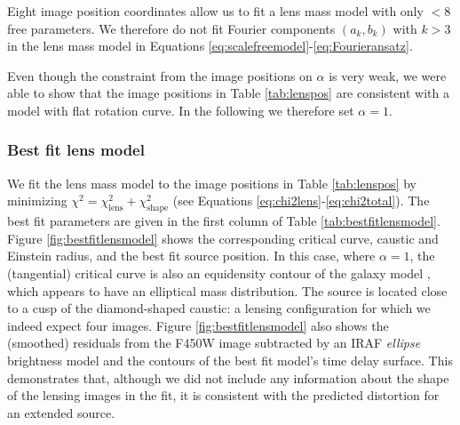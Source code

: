 \documentclass[useAMS,usenatbib]{mnras}
\begin{document}
Eight image position coordinates allow us to fit a lens mass model with only $<8$ free parameters. We therefore do not fit Fourier components $(a_k,b_k)$ with $k > 3$ in the lens mass model in Equations \eqref{eq:scalefreemodel}-\eqref{eq:Fourieransatz}.

Even though the constraint from the image positions on $\alpha$ is very weak, we were able to show that the image positions in Table \ref{tab:lenspos} are consistent with a model with flat rotation curve. In the following we therefore set $\alpha=1$.

\subsubsection{Best fit lens model} \label{sec:results_lensing_bestfit}

We fit the lens mass model to the image positions in Table \ref{tab:lenspos} by minimizing $\chi^2 = \chi_\text{lens}^2 + \chi_\text{shape}^2$ (see Equations \eqref{eq:chi2lens}-\eqref{eq:chi2total}). The best fit parameters are given in the first column of Table \ref{tab:bestfitlensmodel}. Figure \ref{fig:bestfitlensmodel} shows the corresponding critical curve, caustic and Einstein radius, and the best fit source position. In this case, where $\alpha=1$, the (tangential) critical curve is also an equidensity contour of the galaxy model \citep{EvansWitt}, which appears to have an elliptical mass distribution. The source is located close to a cusp of the diamond-shaped caustic: a lensing configuration for which we indeed expect four images. Figure \ref{fig:bestfitlensmodel} also shows the (smoothed) residuals from the F450W image subtracted by an IRAF \emph{ellipse} brightness model and the contours of the best fit model's time delay surface. This demonstrates that, although we did not include any information about the shape of the lensing images in the fit, it is consistent with the predicted distortion for an extended source.
\end{document}
